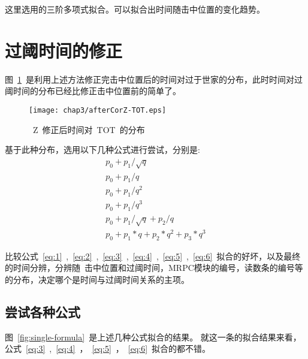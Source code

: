 这里选用的三阶多项式拟合。可以拟合出时间随击中位置的变化趋势。
\section{过阈时间的修正}

图~\ref{fig:afterCorZ-TOT}~是利用上述方法修正完击中位置后的时间对过于世家的分布，此时时间对过阈时间的分布已经比修正击中位置前的简单了。

\begin{figure}[htbp]
\centering
\texttt{[image: chap3/afterCorZ-TOT.eps]}
\caption{~Z~修正后时间对~TOT~的分布}
\label{fig:afterCorZ-TOT}
\end{figure}

基于此种分布，选用以下几种公式进行尝试，分别是:
\begin{align}
p_{0}+p_{1}/\sqrt{q}
\label{eq:1}\\
p_{0}+p_{1}/q
\label{eq:2}\\
p_{0}+p_{1}/q^{2}
\label{eq:3}\\
p_{0}+p_{1}/q^{3}
\label{eq:4}\\
p_{0}+p_{1}/\sqrt{q}+p_{2}/q
\label{eq:5}\\
p_{0}+p_{1}*q+p_{2}*q^{2}+p_{3}*q^3
\label{eq:6}    
\end{align}

比较公式~\ref{eq:1}~,~\ref{eq:2}~,~\ref{eq:3}~,~\ref{eq:4}~,~\ref{eq:5}~,~\ref{eq:6}~拟合的好坏，以及最终的时间分辨，分辨随~击中位置和过阈时间，MRPC模块的编号，读数条的编号等的分布，决定哪个是时间与过阈时间关系的主项。

\subsection{尝试各种公式}

图~\ref{fig:single-formula}~是上述几种公式拟合的结果。
就这一条的拟合结果来看，公式~\ref{eq:3}~,~\ref{eq:4}~，~\ref{eq:5}~，~\ref{eq:6}~拟合的都不错。

